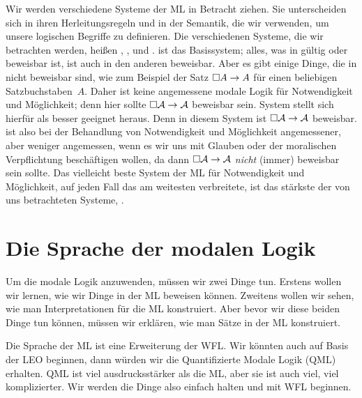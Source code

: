 Wir werden verschiedene Systeme der ML in Betracht ziehen. Sie unterscheiden sich in ihren Herleitungsregeln und in der Semantik, die wir verwenden, um unsere logischen Begriffe zu definieren. Die verschiedenen Systeme, die wir betrachten werden, hei{\ss}en \mlK, \mlT, \mlSfour{} und \mlSfive. \mlK{} ist das Basissystem; alles, was in \mlK{} gültig oder beweisbar ist, ist auch in den anderen beweisbar. Aber es gibt einige Dinge, die in \mlK{} nicht beweisbar sind, wie zum Beispiel der Satz $\Box A \rightarrow A$ für einen beliebigen Satzbuchstaben~$A$. Daher ist \mlK{} keine angemessene modale Logik für Notwendigkeit und Möglichkeit; denn hier sollte $\Box\mathcal{A} \rightarrow \mathcal{A}$ beweisbar sein. System \mlT{} stellt sich hierfür als besser geeignet heraus. Denn in diesem System ist $\Box\mathcal{A} \rightarrow \mathcal{A}$ beweisbar. \mlT{} ist also bei der Behandlung von Notwendigkeit und Möglichkeit angemessener, aber weniger angemessen, wenn es wir uns mit Glauben oder der moralischen Verpflichtung beschäftigen wollen, da dann $\Box\mathcal{A} \rightarrow \mathcal{A}$ \emph{nicht} (immer) beweisbar sein sollte. Das vielleicht beste System der ML für Notwendigkeit und Möglichkeit, auf jeden Fall das am weitesten verbreitete, ist das stärkste der von uns betrachteten Systeme, \mlSfive.

\section{Die Sprache der modalen Logik}
\label{TFLtoML}

Um die modale Logik anzuwenden, müssen wir zwei Dinge tun. Erstens wollen wir lernen, wie wir Dinge in der ML beweisen können. Zweitens wollen wir sehen, wie man Interpretationen für die ML konstruiert. Aber bevor wir diese beiden Dinge tun können, müssen wir erklären, wie man Sätze in der ML konstruiert.

Die Sprache der ML ist eine Erweiterung der WFL. Wir könnten auch auf Basis der LEO beginnen, dann würden wir die Quantifizierte Modale Logik (QML) erhalten. QML ist viel ausdrucksstärker als die ML, aber sie ist auch viel, viel komplizierter. Wir werden die Dinge also einfach halten und mit WFL beginnen.

